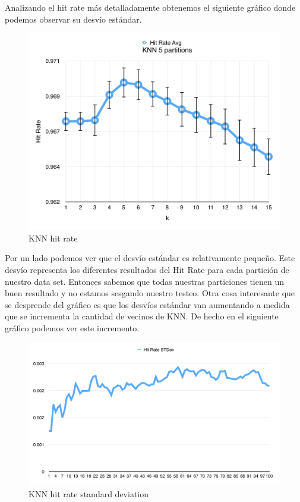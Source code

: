 Analizando el hit rate más detalladamente obtenemos el siguiente gráfico donde podemos observar su desvío estándar.

\newpage

\begin{figure}[h!]
  \begin{center}
	\includegraphics[scale=0.7]{exp1/KNN-5p-Hit-Rate.png}
	\caption{KNN hit rate}
  \end{center}
\end{figure}

Por un lado podemos ver que el desvío estándar es relativamente pequeño. Este desvío representa los diferentes resultados del Hit Rate para cada partición de nuestro data set. Entonces sabemos que todas nuestras particiones tienen un buen resultado y no estamos sesgando nuestro testeo.
Otra cosa interesante que se desprende del gráfico es que los desvíos estándar van aumentando a medida que se incrementa la cantidad de vecinos de KNN. De hecho en el siguiente gráfico podemos ver este incremento.

\begin{figure}[h!]
  \begin{center}
	\includegraphics[scale=0.5]{exp1/KNN-5p-Hit-Rate-stdev.png}
	\caption{KNN hit rate standard deviation}
  \end{center}
\end{figure}


